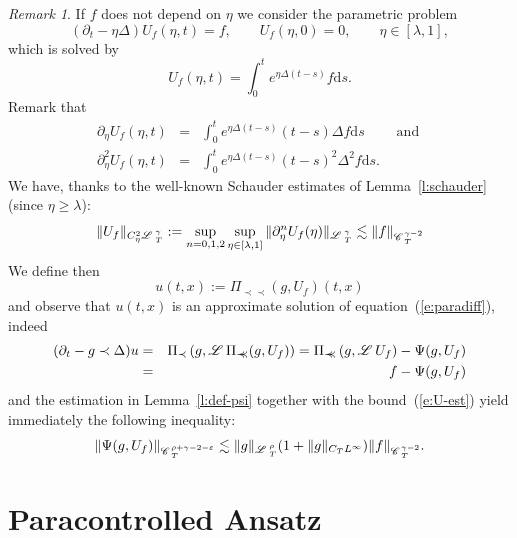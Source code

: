 \documentclass{amsart}
\newcommand{\assign}{:=}
\newcommand{\mathd}{\mathrm{d}}
\newcommand{\precprec}{\prec\!\!\!\prec}
\newcommand{\tmop}[1]{\ensuremath{\operatorname{#1}}}
\theoremstyle{remark}
\newtheorem{remark}[theorem]{Remark}
\theoremstyle{definition}
\newcommand{\CC}{\mathscr{C} \hspace{.1em}}
\newcommand{\LL}{\mathscr{L} \hspace{.2em}}
\begin{document}
\begin{remark}
  \label{r:approx-sol}If $f$ does not depend on $\eta$ we consider the
  parametric problem
  \begin{equation}
    (\partial_t - \eta \Delta) U_f (\eta, t) = f, \qquad U_f (\eta, 0) = 0,
    \qquad \eta \in [\lambda, 1], \label{e:def-U}
  \end{equation}
  which is solved by
  \[ U_f (\eta, t) = \int_0^t e^{\eta \Delta (t - s)} f \mathd s. \]
  Remark that
  \begin{eqnarray*}
    \partial_{\eta} U_f (\eta, t) & = & \int_0^t e^{\eta \Delta (t - s)} (t -
    s) \Delta f \mathd s \qquad \tmop{and}\\
    \partial_{\eta}^2 U_f (\eta, t) & = & \int_0^t e^{\eta \Delta (t - s)} (t
    - s)^2 \Delta^2 f \mathd s.
  \end{eqnarray*}
  We have, thanks to the well-known Schauder estimates of
  Lemma~\ref{l:schauder} (since $\eta \geqslant \lambda$):
  \begin{equation}
    \| U_f \|_{C_{\eta}^2 \LL^{\gamma}_T} \assign \sup_{n = 0, 1, 2}
    \sup_{\eta \in [\lambda, 1]} \| \partial_{\eta}^n U_f (\eta)
    \|_{\LL_T^{\gamma}} \lesssim \| f \|_{\CC^{\gamma - 2}_T}  \label{e:U-est}
  \end{equation}
  We define then
  \begin{equation}
    u (t, x) \assign \Pi_{\precprec} (g, U_f) (t, x) \label{e:def-u}
  \end{equation}
  and observe that $u (t, x)$ is an approximate solution of
  equation~(\ref{e:paradiff}), indeed
  \begin{eqnarray*}
    (\partial_t - g \prec \Delta) u & = & \Pi_{\prec} \left( g, \LL
    \Pi_{\precprec} (g, U_f) \right) = \Pi_{\precprec} \left( g, \LL U_f
    \right) - \Psi (g, U_f)\\
    & = & f - \Psi (g, U_f)
  \end{eqnarray*}
  and the estimation in Lemma~\ref{l:def-psi} together with the
  bound~(\ref{e:U-est}) yield immediately the following inequality:
  \begin{equation}
    \| \Psi (g, U_f) \|_{\CC^{\rho + \gamma - 2 - \varepsilon}_T} \lesssim \|
    g \|_{\LL^{\rho}_T} (1 + \| g \|_{C_T L^{\infty}}) \| f \|_{\CC^{\gamma -
    2}_T} . \label{e:psi-est2}
  \end{equation}
\end{remark}

\section{Paracontrolled Ansatz\label{s:paracontrolled}}
\end{document}
